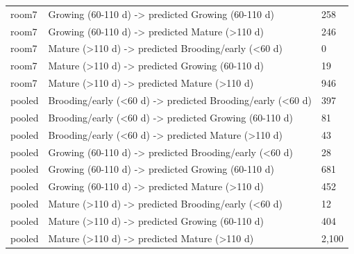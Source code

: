 \begin{tabular}{lll}
room7 & Growing (60-110 d) -> predicted Growing (60-110 d) & 258 \\
room7 & Growing (60-110 d) -> predicted Mature (>110 d) & 246 \\
room7 & Mature (>110 d) -> predicted Brooding/early (<60 d) & 0 \\
room7 & Mature (>110 d) -> predicted Growing (60-110 d) & 19 \\
room7 & Mature (>110 d) -> predicted Mature (>110 d) & 946 \\
pooled & Brooding/early (<60 d) -> predicted Brooding/early (<60 d) & 397 \\
pooled & Brooding/early (<60 d) -> predicted Growing (60-110 d) & 81 \\
pooled & Brooding/early (<60 d) -> predicted Mature (>110 d) & 43 \\
pooled & Growing (60-110 d) -> predicted Brooding/early (<60 d) & 28 \\
pooled & Growing (60-110 d) -> predicted Growing (60-110 d) & 681 \\
pooled & Growing (60-110 d) -> predicted Mature (>110 d) & 452 \\
pooled & Mature (>110 d) -> predicted Brooding/early (<60 d) & 12 \\
pooled & Mature (>110 d) -> predicted Growing (60-110 d) & 404 \\
pooled & Mature (>110 d) -> predicted Mature (>110 d) & 2,100 \\
\hline
\end{tabular}
